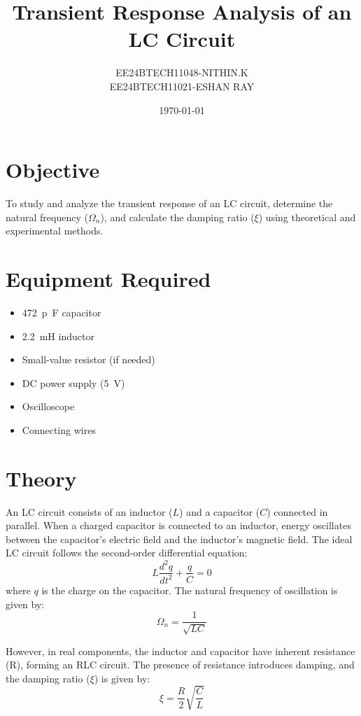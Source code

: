 \documentclass[a4paper,12pt]{article}
\title{Transient Response Analysis of an LC Circuit}
\author{EE24BTECH11048-NITHIN.K \\ EE24BTECH11021-ESHAN RAY}
\date{\today}
\begin{document}
\maketitle

\section{Objective}
To study and analyze the transient response of an LC circuit, determine the natural frequency (\(\Omega_n\)), and calculate the damping ratio (\(\xi\)) using theoretical and experimental methods.

\section{Equipment Required}
\begin{itemize}
    \item \SI{472}{p\farad} capacitor
    \item \SI{2.2}{\milli\henry} inductor
    \item Small-value resistor (if needed)
    \item DC power supply (\SI{5}{V})
    \item Oscilloscope
    \item Connecting wires
\end{itemize}

\section{Theory}
An LC circuit consists of an inductor (\(L\)) and a capacitor (\(C\)) connected in parallel. When a charged capacitor is connected to an inductor, energy oscillates between the capacitor's electric field and the inductor's magnetic field. The ideal LC circuit follows the second-order differential equation:
\begin{equation*}
    L \frac{d^2q}{dt^2} + \frac{q}{C} = 0
\end{equation*}
where \(q\) is the charge on the capacitor. The natural frequency of oscillation is given by:
\begin{equation*}
    \Omega_n = \frac{1}{\sqrt{LC}}
\end{equation*}

However, in real components, the inductor and capacitor have inherent resistance (R), forming an RLC circuit. The presence of resistance introduces damping, and the damping ratio (\(\xi\)) is given by:
\begin{equation*}
    \xi = \frac{R}{2} \sqrt{\frac{C}{L}}
\end{equation*}
\end{document}
